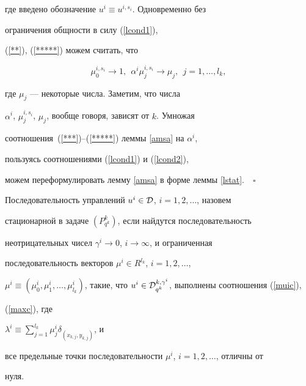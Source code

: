 где введено обозначение $u^i\equiv u^{i,s_i}$. Одновременно без


ограничения общности в силу (\ref{lcond1}),


(\ref{**}), (\ref{*****}) можем считать, что


\begin{equation}\label{lcond2}


\mu_0^{i,s_i}\to 1,\ \  \alpha^i\mu_j^{i,s_i}\to\mu_j,  


\ \ j=1,\dotsc,l_k,


\end{equation}


где $\mu_j$ --- некоторые числа. Заметим, что числа


$\alpha^i$, $\mu_j^{i,s_i}$, $\mu_j$, вообще говоря, зависят от $k$. Умножая


соотношения~(\ref{***})--(\ref{*****}) леммы \ref{amsa} на $\alpha^i$,


пользуясь соотношениями (\ref{lcond1}) и (\ref{lcond2}),


можем переформулировать лемму \ref{amsa} в форме леммы \ref{lstat}.$\quad\square$








\begin{defns}


Последовательность управлений $u^i\in {\cal D}$, $i=1,2,\dotsc$, назовем


стационарной в задаче $(P^k_{q^k})$, если найдутся последовательность


неотрицательных чисел $\gamma^i\to0$, $i\to\infty$, и ограниченная


последовательность векторов $\mu^i\in R^{l_k}$, $i=1,2,\dotsc$,


$\mu^i\equiv(\mu^i_0,\mu^i_1,\dotsc,\mu^i_{l_k})$, такие, что $u^i\in {\cal


D}^{k,\gamma^i}_{q^k}$, выполнены соотношения (\ref{muic}),


(\ref{maxc}), где


$\lambda^i\equiv\sum\limits_{j=1}^{l_k}\mu^i_j\delta_{(x_{k,j},y_{k,j})}$, и


все предельные точки последовательности $\mu^i$, $i=1,2,\dotsc$, отличны от


нуля.


\end{defns}





